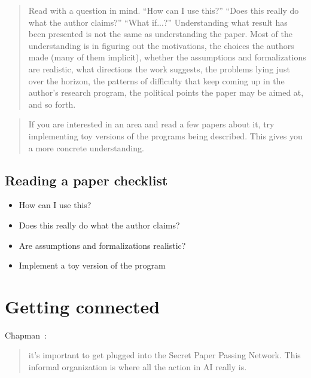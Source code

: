 \blockquote{Read with a question in mind. “How can I use this?” “Does this really do
what the author claims?” “What if...?” Understanding what result has been presented
is not the same as understanding the paper. Most of the understanding
is in figuring out the motivations, the choices the authors made (many of them
implicit), whether the assumptions and formalizations are realistic, what directions
the work suggests, the problems lying just over the horizon, the patterns
of difficulty that keep coming up in the author’s research program, the political
points the paper may be aimed at, and so forth.}

\blockquote{If you are interested in an area and read a few papers about it, try
implementing toy versions of the programs being described. This gives you a more
concrete understanding.}

\subsection{Reading a paper checklist}

\begin{itemize}
\item How can I use this?
\item Does this really do what the author claims?
\item Are assumptions and formalizations realistic?
\item Implement a toy version of the program
\end{itemize}

\section{Getting connected}

Chapman~\cite{chapman1988how}:
\blockquote{it’s important to get plugged into the Secret Paper Passing Network.
This informal organization is where all the action in AI really is.}

